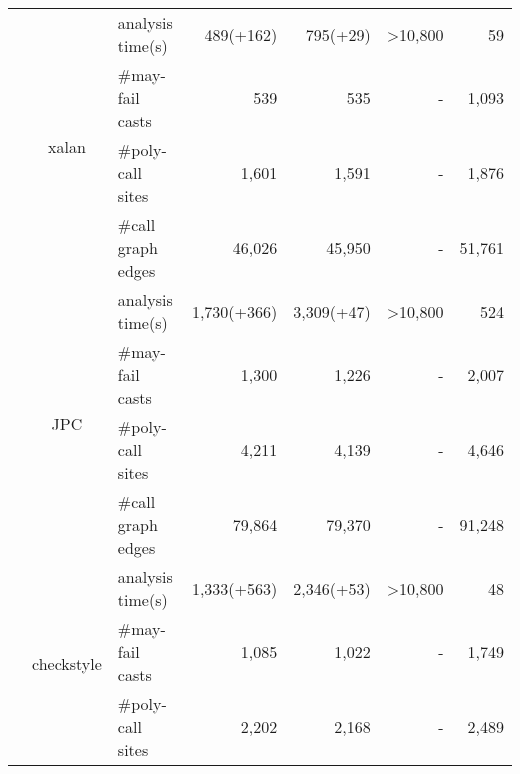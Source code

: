 \begin{table}[]
\begin{tabular}{@{}c|clrrrr@{}}
                                   & \multirow{4}{*}{xalan}      & analysis time(s)   & 489(+162)                      & 795(+29)                         & \textgreater 10,800             & 59                             \\
                                   &                             & \#may-fail casts   & 539                      & 535                         & -                               & 1,093                           \\
                                   &                             & \#poly-call sites  & 1,601                    & 1,591                       & -                               & 1,876                          \\
                                   &                             & \#call graph edges & 46,026                   & 45,950                      & -                               & 51,761                         \\ \cmidrule(l){2-7}
                                   & \multirow{4}{*}{JPC}        & analysis time(s)   & 1,730(+366)                    & 3,309(+47)                       & \textgreater 10,800             & 524                            \\
                                   &                             & \#may-fail casts   & 1,300                    & 1,226                       & -                               & 2,007                          \\
                                   &                             & \#poly-call sites  & 4,211                    & 4,139                       & -                               & 4,646                          \\
                                   &                             & \#call graph edges & 79,864                   & 79,370                      & -                               & 91,248                         \\ \cmidrule(l){2-7}
                                 & \multirow{4}{*}{checkstyle} & analysis time(s)   & 1,333(+563)                    & 2,346(+53)                       & \textgreater 10,800             & 48                             \\
                                   &                             & \#may-fail casts   & 1,085                    & 1,022                       & -                               & 1,749                          \\
                                   &                             & \#poly-call sites  & 2,202                    & 2,168                       & -                               & 2,489                          \\

\end{tabular}
\end{table}
